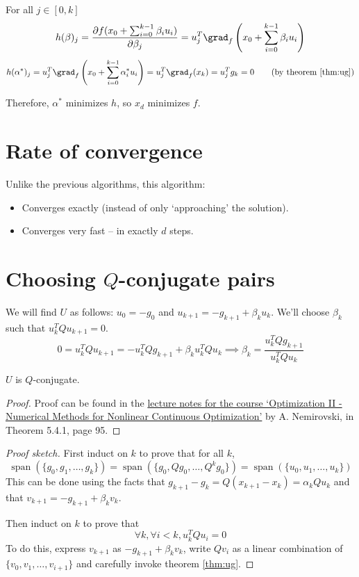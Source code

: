 For all $j \in [0, k]$
\[ h(\beta)_j = \frac{\partial f(x_0 + \sum_{i=0}^{k-1} \beta_i u_i)}{\partial \beta_j}
= u_j^T \grad_f\left(x_0 + \sum_{i=0}^{k-1} \beta_i u_i \right) \]
\[ h(\alpha^*)_j = u_j^T \grad_f\left(x_0 + \sum_{i=0}^{k-1} \alpha_i^* u_i \right)
= u_j^T \grad_f(x_k) = u_j^Tg_k = 0 \tag{by theorem \ref{thm:ug}} \]

Therefore, $\alpha^*$ minimizes $h$, so $x_d$ minimizes $f$.

\section{Rate of convergence}

Unlike the previous algorithms, this algorithm:
\begin{itemize}
\item Converges exactly (instead of only `approaching' the solution).
\item Converges very fast -- in exactly $d$ steps.
\end{itemize}

\section{Choosing \texorpdfstring{$Q$}{Q}-conjugate pairs}

We will find $U$ as follows:
$u_0 = -g_0$ and $u_{k+1} = -g_{k+1} + \beta_k u_k$.
We'll choose $\beta_k$ such that $u_k^TQu_{k+1} = 0$.
\[ 0 = u_k^TQu_{k+1} = -u_k^TQg_{k+1} + \beta_k u_k^TQu_k
\implies \beta_k = \frac{u_k^TQg_{k+1}}{u_k^TQu_k} \]

\begin{theorem}
$U$ is $Q$-conjugate.
\end{theorem}
\begin{proof}
Proof can be found in the
\href{https://www2.isye.gatech.edu/~nemirovs/Lect_OptII.pdf}{
lecture notes for the course
`Optimization II - Numerical Methods for Nonlinear Continuous Optimization'}
by A. Nemirovski, in Theorem 5.4.1, page 95.
\end{proof}

\begin{proof}[Proof sketch]
First induct on $k$ to prove that for all $k$,
\[ \operatorname{span}(\{g_0, g_1, \ldots, g_k\})
= \operatorname{span}(\{g_0, Qg_0, \ldots, Q^kg_0\})
= \operatorname{span}(\{u_0, u_1, \ldots, u_k\}) \]
This can be done using the facts that $g_{k+1} - g_k = Q(x_{k+1} - x_k) = \alpha_kQu_k$
and that $v_{k+1} = -g_{k+1} + \beta_k v_k$.

Then induct on $k$ to prove that
\[ \forall k, \forall i < k, u_k^TQu_i = 0 \]
To do this, express $v_{k+1}$ as $-g_{k+1} + \beta_k v_k$,
write $Qv_i$ as a linear combination of $\{v_0, v_1, \ldots, v_{i+1}\}$
and carefully invoke theorem \ref{thm:ug}.
\end{proof}

